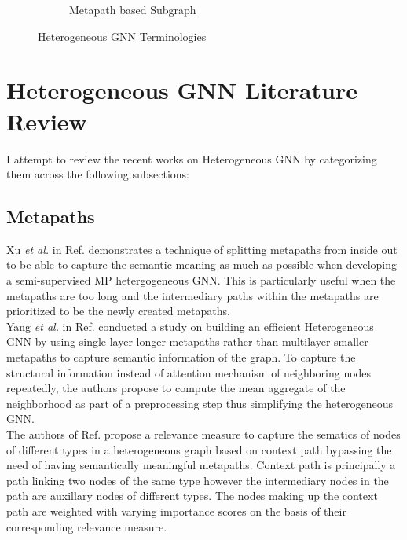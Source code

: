 \documentclass{report} %
\begin{document}
\begin{figure}[H]
\begin{subfigure}{0.35\textwidth}
        \caption{Metapath based Subgraph}
        \label{fig:Metasubgraph}
    \end{subfigure}
    \caption{Heterogeneous \ac{GNN} Terminologies}
    \label{fig:Heterogeneous GNN Terminologies}
\end{figure}

\section{Heterogeneous GNN Literature Review}\label{sec:HGNN Literature Review}
I attempt to review the recent works on Heterogeneous \ac{GNN} by categorizing them across the following subsections:

\subsection{Metapaths}\label{subsec:HGNN Metapaths}
Xu \textit{et al.} in Ref. \cite{EMPHGNN-2023} demonstrates a technique of splitting metapaths from inside out to be able to capture the semantic meaning as much as 
possible when developing a semi-supervised \ac{MP} hetergogeneous \ac{GNN}. This is particularly useful when the metapaths are too long and the 
intermediary paths within the metapaths are prioritized to be the newly created metapaths.\\
Yang \textit{et al.} in Ref. \cite{SE HGNN-2023} conducted a study on building an efficient Heterogeneous \ac{GNN} by using single layer longer metapaths rather than 
multilayer smaller metapaths to capture semantic information of the graph. To capture the structural information instead of attention mechanism of neighboring nodes 
repeatedly, the authors propose to compute the mean aggregate of the neighborhood as part of a preprocessing step thus simplifying the heterogeneous \ac{GNN}. \\
The authors of Ref. \cite{HGNNRM-2023} propose a relevance measure to capture the sematics of nodes of different types in a heterogeneous graph based on context path 
bypassing the need of having semantically meaningful metapaths. Context path is principally a path linking two nodes of the same type however the intermediary nodes in the 
path are auxillary nodes of different types. The nodes making up the context path are weighted with varying importance scores on the basis of their corresponding relevance measure.
\end{document}
